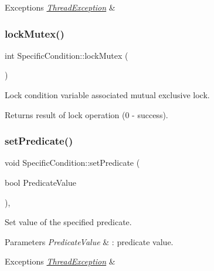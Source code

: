 \begin{DoxyExceptions}{Exceptions}
{\em \hyperlink{classThreadException}{Thread\+Exception}} & \\
\hline
\end{DoxyExceptions}
\mbox{\label{classSpecificCondition_aac09e84b11482d7651a7001a6a0757cd}} 
\subsubsection{\texorpdfstring{lock\+Mutex()}{lockMutex()}}
{\footnotesize\ttfamily int Specific\+Condition\+::lock\+Mutex (\begin{DoxyParamCaption}{ }\end{DoxyParamCaption})\hspace{0.3cm}{\ttfamily [inline]}}

Lock condition variable associated mutual exclusive lock. \begin{DoxyReturn}{Returns}
result of lock operation (0 -\/ success). 
\end{DoxyReturn}
\mbox{\label{classSpecificCondition_ae339d4e8b0e0944887d6e81f284f834e}} 
\subsubsection{\texorpdfstring{set\+Predicate()}{setPredicate()}}
{\footnotesize\ttfamily void Specific\+Condition\+::set\+Predicate (\begin{DoxyParamCaption}\item[{bool}]{Predicate\+Value }\end{DoxyParamCaption})\hspace{0.3cm}{\ttfamily [inline]}, {\ttfamily [noexcept]}}

Set value of the specified predicate. 
\begin{DoxyParams}{Parameters}
{\em Predicate\+Value} & \+: predicate value. \\
\hline
\end{DoxyParams}

\begin{DoxyExceptions}{Exceptions}
{\em \hyperlink{classThreadException}{Thread\+Exception}} & \\
\hline
\end{DoxyExceptions}
\mbox{\label{classSpecificCondition_a8af0e884bb8b3d765b5a59761efdec04}} 
